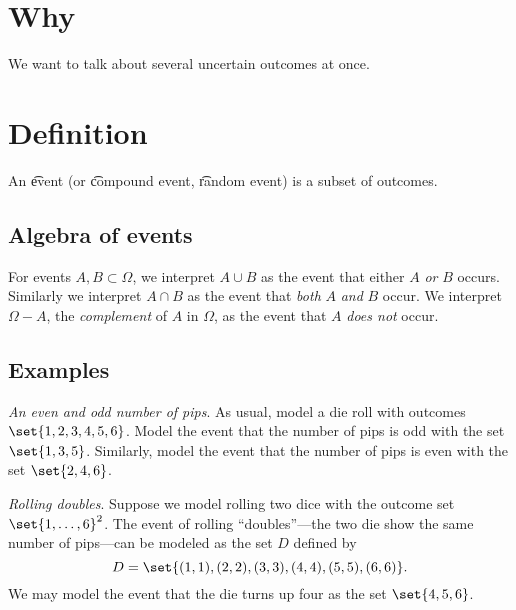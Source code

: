 

\section*{Why}

We want to talk about several uncertain outcomes at once.

\section*{Definition}

An \t{event} (or \t{compound event}, \t{random event}) is a subset of outcomes.

\subsection*{Algebra of events}

For events $A, B \subset \Omega $, we interpret $A \cup B$ as the event that either $A$ \textit{or} $B$ occurs.
Similarly we interpret $A \cap  B$ as the event that \textit{both} $A$ \textit{and} $B$ occur.
We interpret $\Omega  - A$, the \textit{complement} of $A$ in $\Omega $, as the event that $A$ \textit{does not} occur.

\subsection*{Examples}

\textit{An even and odd number of pips}.
As usual, model a die roll with outcomes $\set{1, 2, 3, 4, 5, 6}$.
Model the event that the number of pips is odd with the set $\set{1, 3, 5}$.
Similarly, model the event that the number of pips is even with the set $\set{2, 4, 6}$.

\textit{Rolling doubles}.
Suppose we model rolling two dice with the outcome set $\set{1,\dots ,6}^2$.
The event of rolling ``doubles''---the two die show the same number of pips---can be modeled as the set $D$ defined by
    \[
D = \set{(1,1),(2,2),(3,3),(4,4),(5,5),(6,6)}.
    \]
We may model the event that the die turns up four as the set $\set{4,5 , 6}$.

\blankpage